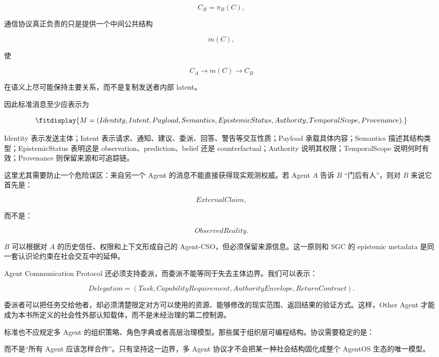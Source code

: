 \[
C_B=\pi_B(C),
\]

通信协议真正负责的只是提供一个中间公共结构

\[
m(C),
\]

使

\[
C_A
\rightarrow
m(C)
\rightarrow
C_B
\]

在语义上尽可能保持主要关系，而不是复制发送者内部 latent。

因此标准消息至少应表示为

\[
\fitdisplay{
M=
(
Identity,
Intent,
Payload,
Semantics,
EpistemicStatus,
Authority,
TemporalScope,
Provenance
).
}
\]

Identity 表示发送主体；Intent 表示请求、通知、建议、委派、回答、警告等交互性质；Payload 承载具体内容；Semantics 描述其结构类型；EpistemicStatus 表明这是 observation、prediction、belief 还是 counterfactual；Authority 说明其权限；TemporalScope 说明何时有效；Provenance 则保留来源和可追踪链。

这里尤其需要防止一个危险误区：来自另一个 Agent 的消息不能直接获得现实观测权威。若 Agent $A$ 告诉 $B$ ``门后有人''，则对 $B$ 来说它首先是：

\[
ExternalClaim,
\]

而不是：

\[
ObservedReality.
\]

$B$ 可以根据对 $A$ 的历史信任、权限和上下文形成自己的 Agent-CSO，但必须保留来源信息。这一原则和 SGC 的 epistemic metadata 是同一套认识论约束在社会交互中的延伸。

Agent Communication Protocol 还必须支持委派，而委派不能等同于失去主体边界。我们可以表示：

\[
Delegation
=
(Task,
CapabilityRequirement,
AuthorityEnvelope,
ReturnContract).
\]

委派者可以把任务交给他者，却必须清楚限定对方可以使用的资源、能够修改的现实范围、返回结果的验证方式。这样，Other Agent 才能成为本书所定义的社会性外部认知载体，而不是未经治理的第二控制源。

标准也不应规定多 Agent 的组织策略、角色字典或者高层治理模型。那些属于组织层可编程结构。协议需要稳定的是：

\begin{statementbox}
\centering
{}
\end{statementbox}

而不是``所有 Agent 应该怎样合作''。只有坚持这一边界，多 Agent 协议才不会把某一种社会结构固化成整个 AgentOS 生态的唯一模型。

